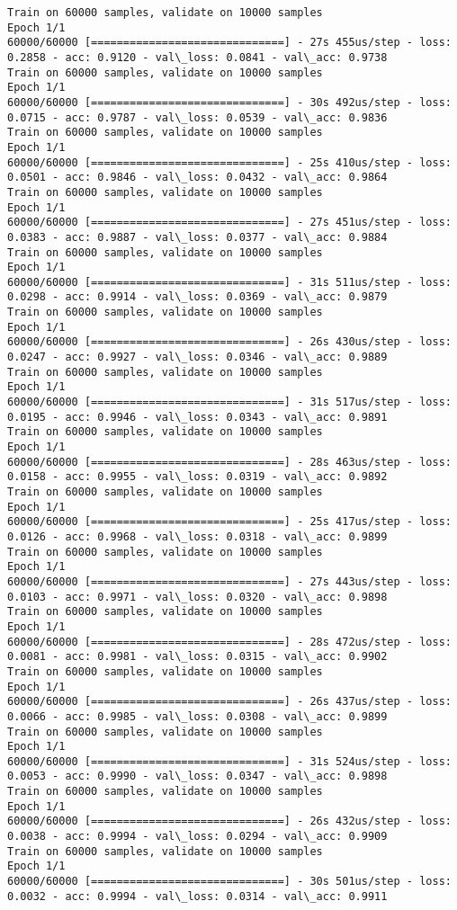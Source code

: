 \documentclass[11pt]{article}
\begin{document}
    \begin{Verbatim}[commandchars=\\\{\}]
Train on 60000 samples, validate on 10000 samples
Epoch 1/1
60000/60000 [==============================] - 27s 455us/step - loss: 0.2858 - acc: 0.9120 - val\_loss: 0.0841 - val\_acc: 0.9738
Train on 60000 samples, validate on 10000 samples
Epoch 1/1
60000/60000 [==============================] - 30s 492us/step - loss: 0.0715 - acc: 0.9787 - val\_loss: 0.0539 - val\_acc: 0.9836
Train on 60000 samples, validate on 10000 samples
Epoch 1/1
60000/60000 [==============================] - 25s 410us/step - loss: 0.0501 - acc: 0.9846 - val\_loss: 0.0432 - val\_acc: 0.9864
Train on 60000 samples, validate on 10000 samples
Epoch 1/1
60000/60000 [==============================] - 27s 451us/step - loss: 0.0383 - acc: 0.9887 - val\_loss: 0.0377 - val\_acc: 0.9884
Train on 60000 samples, validate on 10000 samples
Epoch 1/1
60000/60000 [==============================] - 31s 511us/step - loss: 0.0298 - acc: 0.9914 - val\_loss: 0.0369 - val\_acc: 0.9879
Train on 60000 samples, validate on 10000 samples
Epoch 1/1
60000/60000 [==============================] - 26s 430us/step - loss: 0.0247 - acc: 0.9927 - val\_loss: 0.0346 - val\_acc: 0.9889
Train on 60000 samples, validate on 10000 samples
Epoch 1/1
60000/60000 [==============================] - 31s 517us/step - loss: 0.0195 - acc: 0.9946 - val\_loss: 0.0343 - val\_acc: 0.9891
Train on 60000 samples, validate on 10000 samples
Epoch 1/1
60000/60000 [==============================] - 28s 463us/step - loss: 0.0158 - acc: 0.9955 - val\_loss: 0.0319 - val\_acc: 0.9892
Train on 60000 samples, validate on 10000 samples
Epoch 1/1
60000/60000 [==============================] - 25s 417us/step - loss: 0.0126 - acc: 0.9968 - val\_loss: 0.0318 - val\_acc: 0.9899
Train on 60000 samples, validate on 10000 samples
Epoch 1/1
60000/60000 [==============================] - 27s 443us/step - loss: 0.0103 - acc: 0.9971 - val\_loss: 0.0320 - val\_acc: 0.9898
Train on 60000 samples, validate on 10000 samples
Epoch 1/1
60000/60000 [==============================] - 28s 472us/step - loss: 0.0081 - acc: 0.9981 - val\_loss: 0.0315 - val\_acc: 0.9902
Train on 60000 samples, validate on 10000 samples
Epoch 1/1
60000/60000 [==============================] - 26s 437us/step - loss: 0.0066 - acc: 0.9985 - val\_loss: 0.0308 - val\_acc: 0.9899
Train on 60000 samples, validate on 10000 samples
Epoch 1/1
60000/60000 [==============================] - 31s 524us/step - loss: 0.0053 - acc: 0.9990 - val\_loss: 0.0347 - val\_acc: 0.9898
Train on 60000 samples, validate on 10000 samples
Epoch 1/1
60000/60000 [==============================] - 26s 432us/step - loss: 0.0038 - acc: 0.9994 - val\_loss: 0.0294 - val\_acc: 0.9909
Train on 60000 samples, validate on 10000 samples
Epoch 1/1
60000/60000 [==============================] - 30s 501us/step - loss: 0.0032 - acc: 0.9994 - val\_loss: 0.0314 - val\_acc: 0.9911

    \end{Verbatim}
\end{document}
